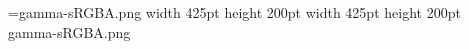 

\ifhint
\HINTimage=gamma-sRGBA.png width 425pt height 200pt\relax
\else
\pdfximage width 425pt height 200pt {gamma-sRGBA.png}\pdfrefximage\pdflastximage
\fi


\vfill
\bye
